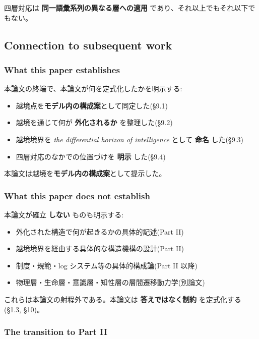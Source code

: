 四層対応は \textbf{同一語彙系列の異なる層への適用} であり、それ以上でもそれ以下でもない。

\subsection{Connection to subsequent work}


\subsubsection{What this paper establishes}


本論文の終端で、本論文が何を定式化したかを明示する:

\begin{itemize}
\item 越境点を\textbf{モデル内の構成案}として同定した(\S{}9.1)
\item 越境を通じて何が \textbf{外化されるか} を整理した(\S{}9.2)
\item 越境境界を \emph{the differential horizon of intelligence} として \textbf{命名} した(\S{}9.3)
\item 四層対応のなかでの位置づけを \textbf{明示} した(\S{}9.4)
\end{itemize}

本論文は越境を\textbf{モデル内の構成案}として提示した。

\subsubsection{What this paper does not establish}


本論文が確立 \textbf{しない} ものも明示する:

\begin{itemize}
\item 外化された構造で何が起きるかの具体的記述(Part II)
\item 越境境界を経由する具体的な構造機構の設計(Part II)
\item 制度・規範・log システム等の具体的構成論(Part II 以降)
\item 物理層・生命層・意識層・知性層の層間遷移動力学(別論文)
\end{itemize}

これらは本論文の射程外である。本論文は \textbf{答えではなく制約} を定式化する(\S{}1.3, \S{}10)。

\subsubsection{The transition to Part II}


